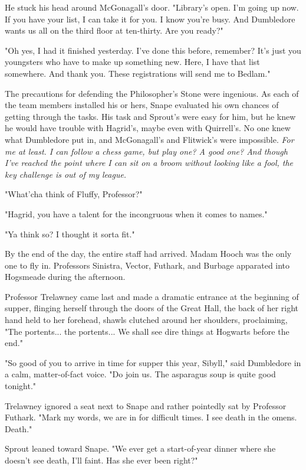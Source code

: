\documentclass[a4paper,11pt]{article}
\begin{document}
He stuck his head around McGonagall's door. "Library's open. I'm going up now. If you have your list, I can take it for you. I know you're busy. And Dumbledore wants us all on the third floor at ten-thirty. Are you ready?"

"Oh yes, I had it finished yesterday. I've done this before, remember? It's just you youngsters who have to make up something new. Here, I have that list somewhere. And thank you. These registrations will send me to Bedlam."

The precautions for defending the Philosopher's Stone were ingenious. As each of the team members installed his or hers, Snape evaluated his own chances of getting through the tasks. His task and Sprout's were easy for him, but he knew he would have trouble with Hagrid's, maybe even with Quirrell's. No one knew what Dumbledore put in, and McGonagall's and Flitwick's were impossible. \emph{For me at least. I can follow a chess game, but play one? A good one? And though I've reached the point where I can sit on a broom without looking like a fool, the key challenge is out of my league.}

"What'cha think of Fluffy, Professor?"

"Hagrid, you have a talent for the incongruous when it comes to names."

"Ya think so? I thought it sorta fit."

By the end of the day, the entire staff had arrived. Madam Hooch was the only one to fly in. Professors Sinistra, Vector, Futhark, and Burbage apparated into Hogsmeade during the afternoon.

Professor Trelawney came last and made a dramatic entrance at the beginning of supper, flinging herself through the doors of the Great Hall, the back of her right hand held to her forehead, shawls clutched around her shoulders, proclaiming, "The portents... the portents... We shall see dire things at Hogwarts before the end."

"So good of you to arrive in time for supper this year, Sibyll," said Dumbledore in a calm, matter-of-fact voice. "Do join us. The asparagus soup is quite good tonight."

Trelawney ignored a seat next to Snape and rather pointedly sat by Professor Futhark. "Mark my words, we are in for difficult times. I see death in the omens. Death."

Sprout leaned toward Snape. "We ever get a start-of-year dinner where she doesn't see death, I'll faint. Has she ever been right?"
\end{document}
